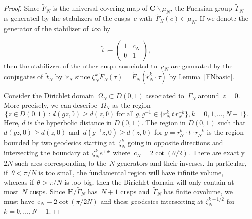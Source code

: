 \documentclass[10pt]{amsart}
\renewcommand\setminus{\smallsetminus}
\def\wGamma{\widetilde{\Gamma}}
\def\wF{\widetilde{F}}
\def\wr{\widetilde{r}}
\def\wt{\widetilde{t}}
\theoremstyle{remark}
\numberwithin{equation}{subsection}
\def\numequation{\addtocounter{subsubsection}{1}\begin{equation}}
\def\C{\mathbf{C}}
\def\H{\mathbf{H}}
\begin{document}
\begin{proof} Since $\wF_N$ is the universal covering map of $\C\setminus \mu_N$,  the Fuchsian group~$\wGamma_N$ is  generated by the stabilizers of the cusps~$c$ with~$\wF_N(c) \in \mu_N$. If we denote
the generator of the stabilizer of~$i \infty$ by
\numequation
\wt:=\left( \begin{matrix} 1& c_N \\ 0 & 1 \end{matrix} \right),
\end{equation}
then the stabilizers of the other cusps associated to~$\mu_N$ are generated by the conjugates of~$\wt_N$ by~$\wr_N$ since $\zeta_N^k\wF_N(\tau)=\wF_N(\wr_N^k\cdot \tau)$ by Lemma~\ref{FNbasic}.

Consider the Dirichlet domain~$\Omega_N\subset D(0,1)$ associated to~$\Gamma_N$
around~$z = 0$. More precisely, we can describe~$\Omega_N$ as the region
$$
\{z \in D(0,1) \, : \,   d(g z,0) \ge  d(z,0)  \ \text{for all} \ g, g^{-1} \in \{r_N^k \, t \, r_N^{-k}\}, k = 0,1,\ldots, N-1 \}.
$$
Here, $d$ is the hyperbolic distance in $D(0,1)$.
The region in $D(0,1)$ such that~$d(g z,0) \ge d(z,0)$ and~$d(g^{-1}z,0) \ge d(z,0)$ for $g=r_N^k \cdot t \cdot r_N^{-k}$
is the region bounded by two geodesics starting at~$\zeta_N^k$ going in opposite directions and intersecting the boundary
at~$\zeta_N^k e^{\pm i \theta}$ where~$c_N = 2 \cot(\theta/2)$.  There are exactly~$2N$ such arcs corresponding to the~$N$
generators and their inverses.
In particular,
if~$\theta < \pi/N$ is too small, the fundamental region will have infinite volume, whereas if~$\theta > \pi/N$ is too big, then
the Dirichlet domain will only contain at most~$N$ cusps. Since $\H/\wGamma_N$ has~$N+1$ cusps and~$\wGamma_N$ has finite covolume, we must have~$c_N = 2 \cot(\pi/2N)$ and these geodesics intersecting at $\zeta_N^{k+1/2}$
for $k=0,\ldots, N-1$.
\end{proof}


 
\end{document}
